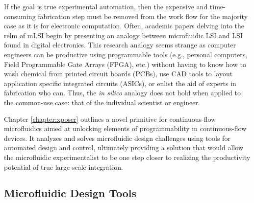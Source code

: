 If the goal is true experimental automation, then the expensive and time-consuming fabrication step must be removed from the work flow for the majority case as it is for electronic computation. Often, academic papers delving into the relm of mLSI begin by presenting an analogy between microfluidic LSI and LSI found in digital electronics. This research analogy seems strange as computer engineers can be productive using programmable tools (e.g., personal computers, Field Programmable Gate Arrays (FPGA), etc.) without having to know how to wash chemical from printed circuit boards (PCBs), use CAD tools to layout application specific integrated circuits (ASICs), or enlist the aid of experts in fabrication who can. Thus, the \emph{in silico} analogy does not hold when applied to the common-use case: that of the individual scientist or engineer.

Chapter \ref{chapter:xposer} outlines a novel primitive for continuous-flow microfluidics aimed at unlocking elements of programmability in continuous-flow devices. It analyzes and solves microfluidic design challenges using tools for automated design and control, ultimately providing a solution that would allow the microfluidic experimentalist to be one step closer to realizing the productivity potential of true large-scale integration. 

\subsection{Microfluidic Design Tools}
\label{ssec:DesignTools}

